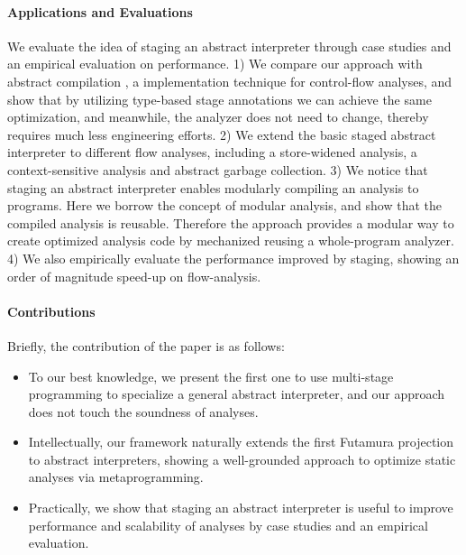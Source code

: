 \paragraph{Applications and Evaluations}
We evaluate the idea of staging an abstract interpreter through
case studies and an empirical evaluation on performance.
1) We compare our approach with abstract compilation
\cite{Boucher:1996:ACN:647473.727587}, a implementation technique for
control-flow analyses, and show that by utilizing type-based stage
annotations we can achieve the same optimization, and meanwhile,
the analyzer does not need to change, thereby requires much less
engineering efforts.
2) We extend the basic staged abstract interpreter to different flow
analyses, including a store-widened analysis, a context-sensitive
analysis and abstract garbage collection.
3) We notice that staging an abstract interpreter enables modularly
compiling an analysis to programs. Here we borrow the concept of
modular analysis, and show that the compiled analysis is reusable.
Therefore the approach provides a modular way to create optimized
analysis code by mechanized reusing a whole-program analyzer.
4) We also empirically evaluate the performance improved by staging,
showing an order of magnitude speed-up on flow-analysis.

\paragraph{Contributions} Briefly, the contribution of the paper is as follows:
\begin{itemize}[leftmargin=2em]
  \item To our best knowledge, we present the first one to use
    multi-stage programming to specialize a general abstract interpreter,
    and our approach does not touch the soundness of analyses.
  \item Intellectually, our framework naturally extends the first
    Futamura projection to abstract interpreters, showing a
    well-grounded approach to optimize static analyses via
    metaprogramming.
  \item Practically, we show that staging an abstract interpreter is
    useful to improve performance and scalability of analyses by case
    studies and an empirical evaluation.
\end{itemize}

